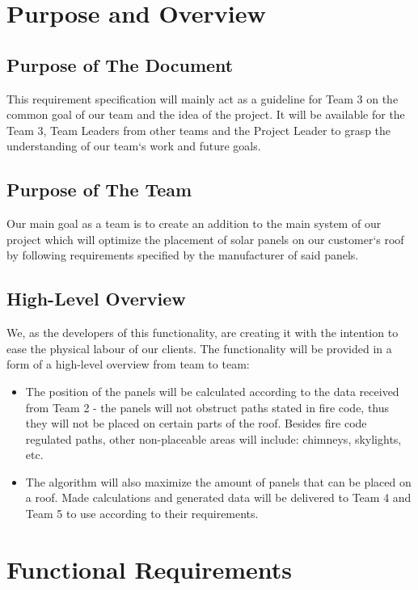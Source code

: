 \documentclass[a4paper,12pt,fleqn]{article}
\begin{document}
\section{Purpose and Overview}

\subsection{Purpose of The Document}

This requirement specification will mainly act as a guideline for Team 3 on the common goal of our team and the idea of the project. It will be available for the Team 3, Team Leaders from other teams and the Project Leader to grasp the understanding of our team‘s work and future goals. 

\subsection{Purpose of The Team}
Our main goal as a team is to create an addition to the main system of our project which will optimize the placement of solar panels on our customer‘s roof by following requirements specified by the manufacturer of said panels. 

\subsection{High-Level Overview}
We, as the developers of this functionality, are creating it with the intention to ease the physical labour of our clients. The functionality will be provided in a form of a high-level overview from team to team: 

\begin{itemize}
    \item The position of the panels will be calculated according to the data received from Team 2 - the panels will not obstruct paths stated in fire code, thus they will not be placed on certain parts of the roof. Besides fire code regulated paths, other non-placeable areas will include: chimneys, skylights, etc.
    
    \item The algorithm will also maximize the amount of panels that can be placed on a roof. Made calculations and generated data will be delivered to Team 4 and Team 5 to use according to their requirements. 
\end{itemize}

\newpage

\section{Functional Requirements}
\end{document}
